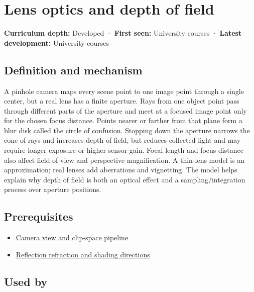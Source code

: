 \hypertarget{appendix-21f8456e2629}{}\label{referencestart:appendix-21f8456e2629}
\section{Lens optics and depth of field}\label{appendix-21f8456e2629-lens-optics-and-depth-of-field}

\textbf{Curriculum depth:} Developed · \textbf{First seen:} University courses · \textbf{Latest development:} University courses

\subsection{Definition and mechanism}\label{appendix-21f8456e2629-definition-and-mechanism}

A pinhole camera maps every scene point to one image point through a single center, but a real lens has a finite aperture. Rays from one object point pass through different parts of the aperture and meet at a focused image point only for the chosen focus distance. Points nearer or farther from that plane form a blur disk called the circle of confusion. Stopping down the aperture narrows the cone of rays and increases depth of field, but reduces collected light and may require longer exposure or higher sensor gain. Focal length and focus distance also affect field of view and perspective magnification. A thin-lens model is an approximation; real lenses add aberrations and vignetting. The model helps explain why depth of field is both an optical effect and a sampling/integration process over aperture positions.

\subsection{Prerequisites}\label{appendix-21f8456e2629-prerequisites}

\begin{itemize}
\tightlist
\item
  \hyperref[appendix-1c07d64f5e70]{Camera view and clip-space pipeline}
\item
  \hyperref[appendix-44e00863b4d5]{Reflection refraction and shading directions}
\end{itemize}

\subsection{Used by}\label{appendix-21f8456e2629-used-by}

